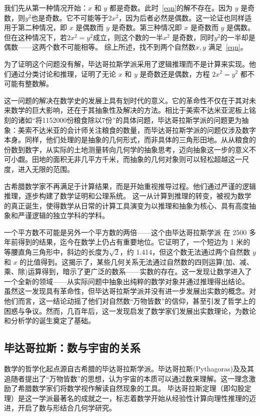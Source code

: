 我们先从第一种情况开始：$x$ 和 $y$ 都是奇数。此时~\eqref{eqn}的解不存在。因为 $y$ 是奇数，则$y^2$也是奇数。它不可能等于$2x^2$，因为后者必然是偶数。这一论证也同样适用于第二种情况，即 $x$ 是偶数而 $y$ 是奇数。第三种情况即 $x$ 是奇数而 $y$ 是偶数。但在这种情况下，若$2x^2=y^2$成立，则这个数的一半$x^2$ 是奇数，同时$y^2$的一半却是偶数——这两个数不可能相等。
综上所述，找不到两个自然数$x,y$ 满足~\eqref{eqn}。

为了证明这个问题没有解，毕达哥拉斯学派采用了逻辑推理而不是计算来实现。他们通过分类讨论和推理，证明了无论 $x$ 和 $y$ 是奇数还是偶数，方程 $2x^2 = y^2$ 都不可能有整数解。

这一问题的解决在数学史的发展上具有划时代的意义。它的革命性不仅在于其对未来数学的巨大影响，还在于其抽象性及解决的方法。相比于美索不达米亚泥板上铭刻的诸如“将1152000份粮食除以7份”的具体问题，毕达哥拉斯学派的问题更为抽象：美索不达米亚的会计师关注粮食的数量，而毕达哥拉斯学派的问题仅涉及数字本身。同样，他们处理的是抽象的几何形式，而非具体的三角形田地。从从粮食的份数到数字，从实际的土地测量转向几何学的抽象思考，迈向抽象这一步的意义不可小觑。田地的面积无非几平方千米，而抽象的几何对象则可以轻松超越这一尺度，进入无限的范围。

古希腊数学家不再满足于计算结果，而是开始重视推导过程。他们通过严谨的逻辑推理，逐步构建了数学证明和公理系统。
这一从计算到推理的转变，被视为数学的真正诞生，使得数学从日常的计算工具演变为以推理和抽象为核心、具有高度抽象和严谨逻辑的独立学科的学科。

一个平方数不可能是另外一个平方数的两倍——这个由毕达哥拉斯学派 在 2500 多年前得到的结果，迄今在数学上仍占有重要地位。它证明了，一个短边为 1 米的等腰直角三角形中，斜边的长度为$\sqrt{2}$，约 1.414，但这个数无法通过两个自然数 $y$ 和 $x$ 的比值得到。这揭示了，某些几何关系无法通过自然数的四则运算(加、减、乘、除)运算得到，暗示了更广泛的数系——实数的存在。这一发现让数学进入了一个全新的领域——从实际问题中抽象出纯粹的数学对象并通过推理得出结论。
虽然这一发现具有革命性，但毕达哥拉斯学派并没有进一步发展出实数的概念。对他们而言，这一结论动摇了他们对自然数“万物皆数”的信仰，甚至引发了哲学上的困惑与争议。然而，几百年后，这一发现启发了数学家们发展出实数理论，为数论和分析学的诞生奠定了基础。

\subsection{毕达哥拉斯：数与宇宙的关系}
数学的哲学化起点源自古希腊的毕达哥拉斯学派。毕达哥拉斯(Pythagoras)及及其追随者提出了“万物皆数”的思想，认为宇宙的本质可以通过数来理解。这一理念激励了希腊数学家们将数学视作解读自然现象的工具。
毕达哥拉斯定理（即勾股定理）是这一学派最著名的成就之一，标志着数学开始从经验性计算向理性推理的迈进，开启了数与形结合几何学研究。

